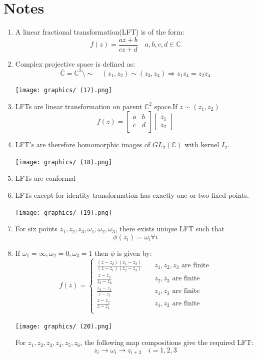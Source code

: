 \documentclass[12pt,oneside]{book}
\begin{document}
\section{Notes}
\begin{enumerate}
    \item A linear fractional transformation(LFT) is of the form:
        $$f(z)=\frac{az+b}{cz+d}\quad a,b,c,d\in\mathbb C$$
    \item Complex projective space is defined as:
    $$\overline{\mathbb C}=\mathbb C^2\setminus\sim\quad(z_1,z_2)\sim(z_3,z_4)\Rightarrow z_1z_4=z_2z_4$$
    \begin{marginfigure}%
        \texttt{[image: graphics/ (17).png]}
    \end{marginfigure}%
    \item LFTs are linear transformation on parent $\mathbb C^2$ space.If $z\sim(z_1,z_2)$
    $$f(z)=\begin{bmatrix}
        a &b\\
        c &d\\
    \end{bmatrix}\begin{bmatrix}
        z_1\\z_2
    \end{bmatrix}$$
    \item LFT's are therefore homomorphic images of $GL_2(\mathbb C)$ with kernel $I_2$.
    \begin{marginfigure}%
        \texttt{[image: graphics/ (18).png]}
    \end{marginfigure}%
    \item LFTs are conformal
    \item LFTs except for identity transformation has exactly one or two fixed points.
    \begin{marginfigure}%
        \texttt{[image: graphics/ (19).png]}
    \end{marginfigure}%
    \item For six points $z_1,z_2,z_3,\omega_1,\omega_2,\omega_3$, there exists unique LFT such that
    $$\phi(z_i)=\omega_i\forall i$$
    \item If $\omega_1=\infty,\omega_2=0,\omega_3=1$ then $\phi$ is given by:
    $$f(z)=\begin{cases}
        \frac{(z-z_2)(z_1-z_3)}{(z-z_1)(z_2-z_3)}\quad&z_1,z_2,z_3\text{ are finite}\\
        \frac{z-z_2}{z_3-z_2}\quad&z_2,z_3\text{ are finite}\\
        \frac{z_3-z_1}{z-z_1}\quad&z_1,z_3\text{ are finite}\\
        \frac{z-z_2}{z-z_1}\quad&z_1,z_2\text{ are finite}\\
    \end{cases}$$ 
    \begin{marginfigure}%
        \texttt{[image: graphics/ (20).png]}
    \end{marginfigure}%
    For $z_1,z_2,z_3,z_4,z_5,z_6$, the following map compositions give the required LFT:
    $$z_i\to \omega_i\to z_{i+3}\quad i=1,2,3$$
\end{enumerate}
\end{document}
